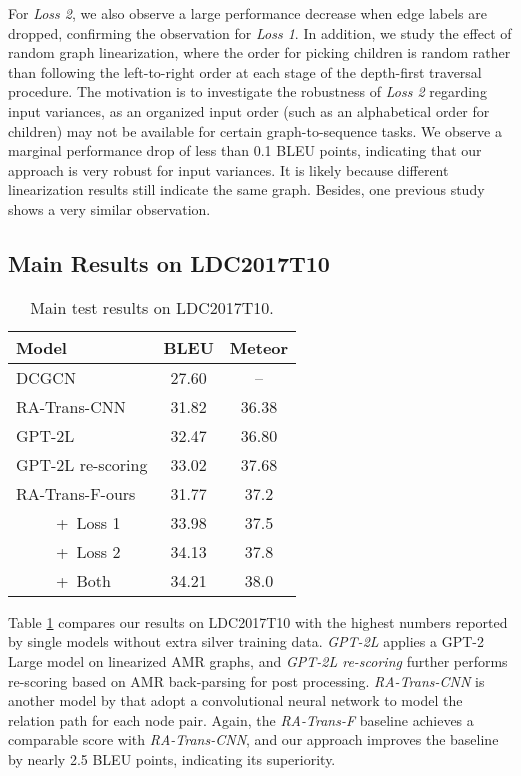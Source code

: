 \documentclass[11pt,a4paper]{article}
\begin{document}
For \emph{Loss 2}, we also observe a large performance decrease when edge labels are dropped, confirming the observation for \emph{Loss 1}.
In addition, we study the effect of random graph linearization, where the order for picking children is random rather than following the left-to-right order at each stage of the depth-first traversal procedure.
The motivation is to investigate the robustness of \emph{Loss 2} regarding input variances, as an organized input order (such as an alphabetical order for children) may not be available for certain graph-to-sequence tasks.
We observe a marginal performance drop of less than 0.1 BLEU points, indicating that our approach is very robust for input variances.
It is likely because different linearization results still indicate the same graph.
Besides, one previous study \citep{konstas2017neural} shows a very similar observation.


\subsection{Main Results on LDC2017T10}
\label{sec:results_2017}


\begin{table}
    \centering
    \begin{tabular}{lcc}
    \toprule
    Model & BLEU & Meteor \\
    \midrule
    DCGCN & 27.60 & -- \\
    RA-Trans-CNN & 31.82 & 36.38 \\
    GPT-2L & 32.47 & 36.80 \\
    GPT-2L re-scoring & 33.02 & 37.68 \\
    \hline
    RA-Trans-F-ours & 31.77 & 37.2 \\
    ~~~~~+~Loss 1 & 33.98 & 37.5 \\
    ~~~~~+~Loss 2 & 34.13 & 37.8 \\
    ~~~~~+~Both & 34.21 & 38.0 \\
    \bottomrule
    \end{tabular}
    \caption{Main test results on LDC2017T10.}
    \label{tab:main_2017}
\end{table}


Table \ref{tab:main_2017} compares our results on LDC2017T10 with the highest numbers reported by single models without extra silver training data.
\emph{GPT-2L} \cite{mager-etal-2020-gpt} applies a GPT-2 Large model \cite{radford2019language} on linearized AMR graphs, and \emph{GPT-2L re-scoring} further performs re-scoring based on AMR back-parsing for post processing.
\emph{RA-Trans-CNN} is another model by \citet{zhu2019modeling} that adopt a convolutional neural network \cite{lecun1990handwritten} to model the relation path for each node pair.
Again, the \emph{RA-Trans-F} baseline achieves a comparable score with \emph{RA-Trans-CNN}, and our approach improves the baseline by nearly 2.5 BLEU points, indicating its superiority.
\end{document}
